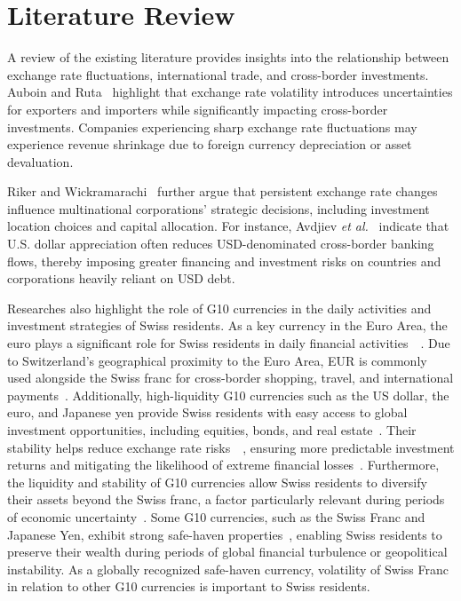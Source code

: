 \documentclass{article}
\begin{document}
\section{Literature Review}
A review of the existing literature provides insights into the relationship between exchange rate fluctuations, international trade, and cross-border investments. Auboin and Ruta~\cite{AUBOIN_RUTA_2013} highlight that exchange rate volatility introduces uncertainties for exporters and importers while significantly impacting cross-border investments. Companies experiencing sharp exchange rate fluctuations may experience revenue shrinkage due to foreign currency depreciation or asset devaluation.

Riker and Wickramarachi~\cite{riker2020review} further argue that persistent exchange rate changes influence multinational corporations' strategic decisions, including investment location choices and capital allocation. For instance, Avdjiev \textit{et al.}~\cite{dollar_exchange} indicate that U.S. dollar appreciation often reduces USD-denominated cross-border banking flows, thereby imposing greater financing and investment risks on countries and corporations heavily reliant on USD debt.

Researches also highlight the role of G10 currencies in the daily activities and investment strategies of Swiss residents. As a key currency in the Euro Area, the euro plays a significant role for Swiss residents in daily financial activities~\cite{engel2016exchange}~\cite{goulferni2023switzerland}. Due to Switzerland's geographical proximity to the Euro Area, EUR is commonly used alongside the Swiss franc for cross-border shopping, travel, and international payments~\cite{sif_imf_reports}. Additionally, high-liquidity G10 currencies such as the US dollar, the euro, and Japanese yen provide Swiss residents with easy access to global investment opportunities, including equities, bonds, and real estate~\cite{rogoff2000six}. Their stability helps reduce exchange rate risks~\cite{campbell2002strategic}~\cite{engel2016exchange}, ensuring more predictable investment returns and mitigating the likelihood of extreme financial losses~\cite{de1998big}. Furthermore, the liquidity and stability of G10 currencies allow Swiss residents to diversify their assets beyond the Swiss franc, a factor particularly relevant during periods of economic uncertainty~\cite{ito2020currency}. Some G10 currencies, such as the Swiss Franc and Japanese Yen, exhibit strong safe-haven properties~\cite{ranaldo2010safe}, enabling Swiss residents to preserve their wealth during periods of global financial turbulence or geopolitical instability. As a globally recognized safe-haven currency, volatility of Swiss Franc in relation to other G10 currencies is important to Swiss residents.
\end{document}
